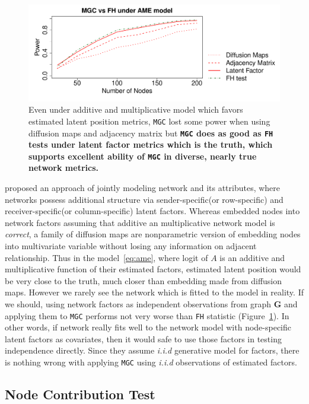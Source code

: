 \documentclass[12pt]{article}
\theoremstyle{definition}
\begin{document}
\begin{figure}[H]
	\centering
	\includegraphics[width=\linewidth]{../Figure/ame_part.pdf}
	\caption{Even under additive and multiplicative model which favors estimated latent position metrics, \texttt{MGC} lost some power when using diffusion maps and adjacency matrix but \textbf{\texttt{MGC} does as good as \texttt{FH} tests under latent factor metrics which is the truth, which supports excellent ability of \texttt{MGC} in diverse, nearly true network metrics.}}
	\label{fig:ame}
\end{figure}

\cite{hoff2002latent} proposed an approach of jointly modeling network and its attributes, where networks possess additional structure via sender-specific(or row-specific) and receiver-specific(or column-specific) latent factors. Whereas \cite{fosdick2015testing} embedded nodes into network factors assuming that additive an multiplicative network model is \textit{correct}, a family of diffusion maps are nonparametric version of embedding nodes into multivariate variable without losing any information on adjacent relationship. Thus in the model~\ref{eq:ame}, where logit of $A$ is an additive and multiplicative function of their estimated factors, estimated latent position would be very close to the truth, much closer than embedding made from diffusion maps. However we rarely see the network which is fitted to the model in reality. If we should, using network factors as independent observations from graph \textbf{G} and applying them to \texttt{MGC} performs not very worse than \texttt{FH} statistic (Figure~\ref{fig:ame}). In other words, if network really fits well to the network model with node-specific latent factors as covariates, then it would safe to use those factors in testing independence directly. Since they assume \textit{i.i.d} generative model for factors, there is nothing wrong with applying \texttt{MGC} using \textit{i.i.d} observations of estimated factors.

\subsection{Node Contribution Test}
\label{ssec:node}
\end{document}
